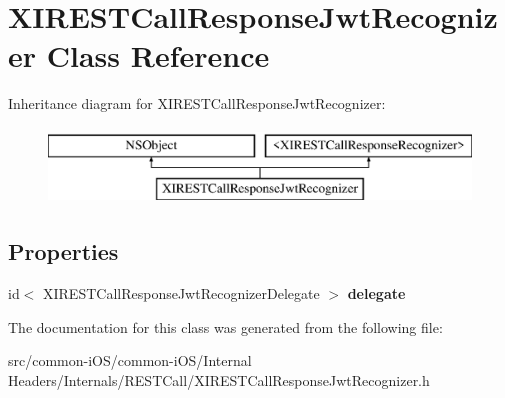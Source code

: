 \hypertarget{interface_x_i_r_e_s_t_call_response_jwt_recognizer}{}\section{X\+I\+R\+E\+S\+T\+Call\+Response\+Jwt\+Recognizer Class Reference}
\label{interface_x_i_r_e_s_t_call_response_jwt_recognizer}
Inheritance diagram for X\+I\+R\+E\+S\+T\+Call\+Response\+Jwt\+Recognizer\+:\begin{figure}[H]
\begin{center}
\leavevmode
\includegraphics[height=2.000000cm]{interface_x_i_r_e_s_t_call_response_jwt_recognizer}
\end{center}
\end{figure}
\subsection*{Properties}
\begin{DoxyCompactItemize}
\item 
\hypertarget{interface_x_i_r_e_s_t_call_response_jwt_recognizer_a7fc5eff6227aaa161f4c2ab2095b75ee}{}\label{interface_x_i_r_e_s_t_call_response_jwt_recognizer_a7fc5eff6227aaa161f4c2ab2095b75ee} 
id$<$ X\+I\+R\+E\+S\+T\+Call\+Response\+Jwt\+Recognizer\+Delegate $>$ {\bfseries delegate}
\end{DoxyCompactItemize}


The documentation for this class was generated from the following file\+:\begin{DoxyCompactItemize}
\item 
src/common-\/i\+O\+S/common-\/i\+O\+S/\+Internal Headers/\+Internals/\+R\+E\+S\+T\+Call/X\+I\+R\+E\+S\+T\+Call\+Response\+Jwt\+Recognizer.\+h\end{DoxyCompactItemize}
